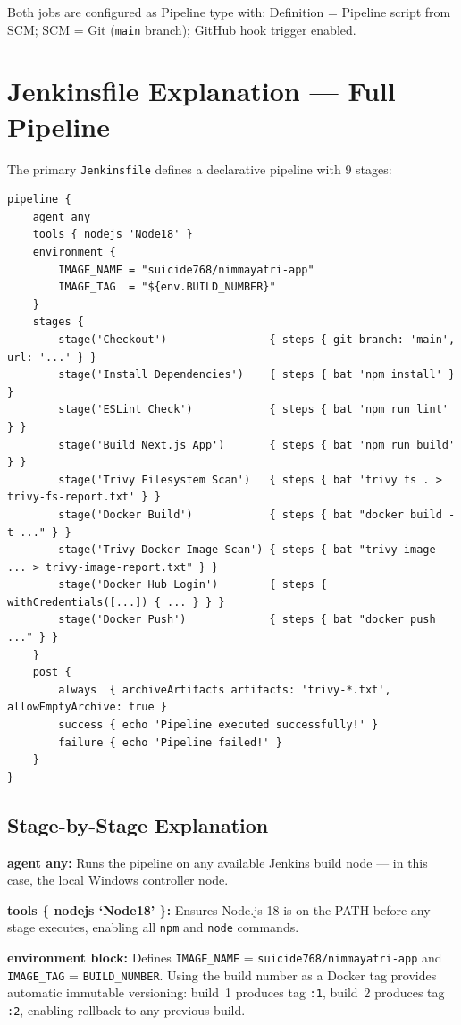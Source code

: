 \documentclass[12pt,a4paper,oneside]{report}
\begin{document}
Both jobs are configured as Pipeline type with: Definition = Pipeline script from SCM;
SCM = Git (\texttt{main} branch); GitHub hook trigger enabled.

\section{Jenkinsfile Explanation --- Full Pipeline}

The primary \texttt{Jenkinsfile} defines a declarative pipeline with 9 stages:

\begin{lstlisting}
pipeline {
    agent any
    tools { nodejs 'Node18' }
    environment {
        IMAGE_NAME = "suicide768/nimmayatri-app"
        IMAGE_TAG  = "${env.BUILD_NUMBER}"
    }
    stages {
        stage('Checkout')                { steps { git branch: 'main', url: '...' } }
        stage('Install Dependencies')    { steps { bat 'npm install' } }
        stage('ESLint Check')            { steps { bat 'npm run lint' } }
        stage('Build Next.js App')       { steps { bat 'npm run build' } }
        stage('Trivy Filesystem Scan')   { steps { bat 'trivy fs . > trivy-fs-report.txt' } }
        stage('Docker Build')            { steps { bat "docker build -t ..." } }
        stage('Trivy Docker Image Scan') { steps { bat "trivy image ... > trivy-image-report.txt" } }
        stage('Docker Hub Login')        { steps { withCredentials([...]) { ... } } }
        stage('Docker Push')             { steps { bat "docker push ..." } }
    }
    post {
        always  { archiveArtifacts artifacts: 'trivy-*.txt', allowEmptyArchive: true }
        success { echo 'Pipeline executed successfully!' }
        failure { echo 'Pipeline failed!' }
    }
}
\end{lstlisting}

\subsection{Stage-by-Stage Explanation}

\textbf{agent any:} Runs the pipeline on any available Jenkins build node --- in
this case, the local Windows controller node.

\textbf{tools \{ nodejs `Node18' \}:} Ensures Node.js 18 is on the PATH before
any stage executes, enabling all \texttt{npm} and \texttt{node} commands.

\textbf{environment block:} Defines \texttt{IMAGE\_NAME} =
\texttt{suicide768/nimmayatri-app} and \texttt{IMAGE\_TAG} = \texttt{BUILD\_NUMBER}.
Using the build number as a Docker tag provides automatic immutable versioning:
build~1 produces tag \texttt{:1}, build~2 produces tag \texttt{:2}, enabling
rollback to any previous build.
\end{document}
